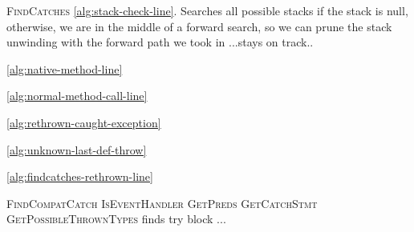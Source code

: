 \textsc{FindCatches} \ref{alg:stack-check-line}.  Searches all possible stacks
if the stack is null, otherwise, we are in the middle of a forward
search, so we can prune the stack unwinding with the forward path we
took in ...stays on track..


\ref{alg:native-method-line}

\ref{alg:normal-method-call-line}

\ref{alg:rethrown-caught-exception}

\ref{alg:unknown-last-def-throw}

\ref{alg:findcatches-rethrown-line}

\textsc{FindCompatCatch}
\textsc{IsEventHandler}
\textsc{GetPreds}
\textsc{GetCatchStmt}
\textsc{GetPossibleThrownTypes} finds try block ...
